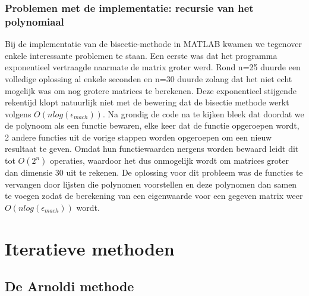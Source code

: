 \documentclass[a4paper]{article}
\begin{document}
\subsubsection{Problemen met de implementatie: recursie van het polynomiaal}
Bij de implementatie van de bisectie-methode in MATLAB kwamen we tegenover enkele interessante problemen te staan. Een eerste was dat het programma exponentieel vertraagde naarmate de matrix groter werd. Rond n=25 duurde een volledige oplossing al enkele seconden en n=30 duurde zolang dat het niet echt mogelijk was om nog grotere matrices te berekenen. Deze exponentieel stijgende rekentijd klopt natuurlijk niet met de bewering dat de bisectie methode werkt volgens $O(nlog(\epsilon_{mach}))$. Na grondig de code na te kijken bleek dat doordat we de polynoom als een functie bewaren, elke keer dat de functie opgeroepen wordt, 2 andere functies uit de vorige stappen worden opgeroepen om een nieuw resultaat te geven. Omdat hun functiewaarden nergens worden bewaard leidt dit tot $O(2^{n})$ operaties, waardoor het dus onmogelijk wordt om matrices groter dan dimensie 30 uit te rekenen. De oplossing voor dit probleem was de functies te vervangen door lijsten die polynomen voorstellen en deze polynomen dan samen te voegen zodat de berekening van een eigenwaarde voor een gegeven matrix weer $O(nlog(\epsilon_{mach}))$ wordt.


\section{Iteratieve methoden}
\subsection{De Arnoldi methode}
\end{document}
